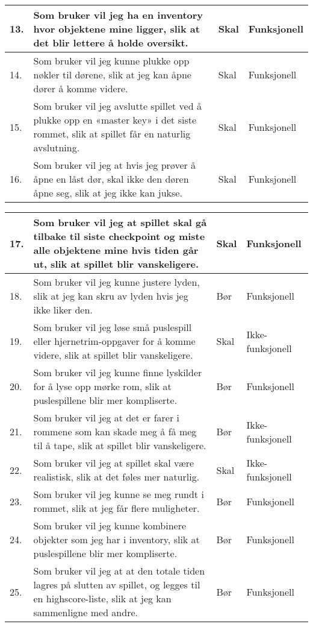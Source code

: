 \documentclass[fontsize=11pt]{scrartcl}
\begin{document}
\begin{center}
\begin{tabular}{ | m{0.4cm} | m{10cm} | m{2cm} | m{2cm} | }
\\ \hline
13. & Som bruker vil jeg ha en inventory hvor objektene mine ligger, slik at det blir lettere å holde oversikt. & Skal & Funksjonell
\\ \hline
14. & Som bruker vil jeg kunne plukke opp nøkler til dørene, slik at jeg kan åpne dører å komme videre. & Skal & Funksjonell
\\ \hline
15. & Som bruker vil jeg avslutte spillet ved å plukke opp en «master key» i det siste rommet, slik at spillet får en naturlig avslutning. & Skal & Funksjonell
\\ \hline
16. & Som bruker vil jeg at hvis jeg prøver å åpne en låst dør, skal ikke den døren åpne seg, slik at jeg ikke kan jukse. & Skal & Funksjonell
\\ \hline
\end{tabular}


\begin{tabular}{ | m{0.4cm} | m{10cm} | m{2cm} | m{2cm} | }
\hline
17. & Som bruker vil jeg at spillet skal gå tilbake til siste checkpoint og miste alle objektene mine hvis tiden går ut, slik at spillet blir vanskeligere. & Skal & Funksjonell
\\ \hline
18. & Som bruker vil jeg kunne justere lyden, slik at jeg kan skru av lyden hvis jeg ikke liker den. & Bør & Funksjonell
\\ \hline
19. & Som bruker vil jeg løse små puslespill eller hjernetrim-oppgaver for å komme videre, slik at spillet blir vanskeligere. & Skal & Ikke-funksjonell
\\ \hline
20. & Som bruker vil jeg kunne finne lyskilder for å lyse opp mørke rom, slik at puslespillene blir mer kompliserte. & Bør & Funksjonell
\\ \hline
21. & Som bruker vil jeg at det er farer i rommene som kan skade meg å få meg til å tape, slik at spillet blir vanskeligere. & Bør & Ikke-funksjonell
\\ \hline
22. & Som bruker vil jeg at spillet skal være realistisk, slik at det føles mer naturlig. & Skal & Ikke-funksjonell
\\ \hline
23. & Som bruker vil jeg kunne se meg rundt i rommet, slik at jeg får flere muligheter. & Bør & Funksjonell
\\ \hline
24. & Som bruker vil jeg kunne kombinere objekter som jeg har i inventory, slik at puslespillene blir mer kompliserte. & Bør & Funksjonell
\\ \hline
25. & Som bruker vil jeg at at den totale tiden lagres på slutten av spillet, og legges til en highscore-liste, slik at jeg kan sammenligne med andre. & Bør & Funksjonell
\\ \hline
 
 
\end{tabular}
\end{center}
\end{document}
